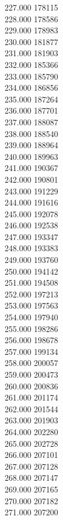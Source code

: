 { 227.000	178115 \\
 228.000	178586 \\
 229.000	178983 \\
 230.000	181877 \\
 231.000	181903 \\
 232.000	185366 \\
 233.000	185790 \\
 234.000	186856 \\
 235.000	187264 \\
 236.000	187701 \\
 237.000	188087 \\
 238.000	188540 \\
 239.000	188964 \\
 240.000	189963 \\
 241.000	190367 \\
 242.000	190801 \\
 243.000	191229 \\
 244.000	191616 \\
 245.000	192078 \\
 246.000	192538 \\
 247.000	193347 \\
 248.000	193383 \\
 249.000	193760 \\
 250.000	194142 \\
 251.000	194508 \\
 252.000	197213 \\
 253.000	197563 \\
 254.000	197940 \\
 255.000	198286 \\
 256.000	198678 \\
 257.000	199134 \\
 258.000	200057 \\
 259.000	200473 \\
 260.000	200836 \\
 261.000	201174 \\
 262.000	201544 \\
 263.000	201903 \\
 264.000	202280 \\
 265.000	202728 \\
 266.000	207101 \\
 267.000	207128 \\
 268.000	207147 \\
 269.000	207165 \\
 270.000	207182 \\
 271.000	207200 \\
}
